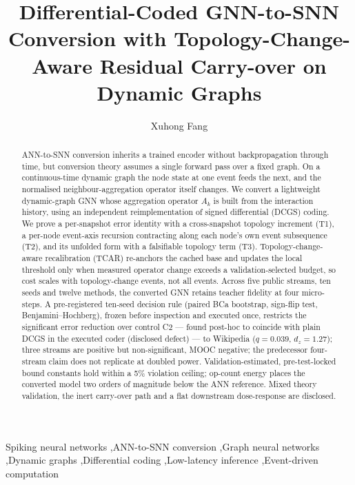 \documentclass[preprint,12pt]{elsarticle}
\begin{document}
\begin{frontmatter}

\title{Differential-Coded GNN-to-SNN Conversion with Topology-Change-Aware Residual Carry-over on Dynamic Graphs}

\author{Xuhong Fang}
\address{Dongguan City College, Dongguan, Guangdong, China}

\begin{abstract}
ANN-to-SNN conversion inherits a trained encoder without backpropagation through time, but conversion theory assumes a single forward pass over a fixed graph. On a continuous-time dynamic graph the node state at one event feeds the next, and the normalised neighbour-aggregation operator itself changes. We convert a lightweight dynamic-graph GNN whose aggregation operator $A_k$ is built from the interaction history, using an independent reimplementation of signed differential (DCGS) coding. We prove a per-snapshot error identity with a cross-snapshot topology increment (T1), a per-node event-axis recursion contracting along each node's own event subsequence (T2), and its unfolded form with a falsifiable topology term (T3). Topology-change-aware recalibration (TCAR) re-anchors the cached base and updates the local threshold only when measured operator change exceeds a validation-selected budget, so cost scales with topology-change events, not all events. Across five public streams, ten seeds and twelve methods, the converted GNN retains teacher fidelity at four micro-steps. A pre-registered ten-seed decision rule (paired BCa bootstrap, sign-flip test, Benjamini--Hochberg), frozen before inspection and executed once, restricts the significant error reduction over control C2 --- found post-hoc to coincide with plain DCGS in the executed coder (disclosed defect) --- to Wikipedia ($q=0.039$, $d_z=1.27$); three streams are positive but non-significant, MOOC negative; the predecessor four-stream claim does not replicate at doubled power. Validation-estimated, pre-test-locked bound constants hold within a 5\% violation ceiling; op-count energy places the converted model two orders of magnitude below the ANN reference. Mixed theory validation, the inert carry-over path and a flat downstream dose-response are disclosed.
\end{abstract}

\begin{keyword}
Spiking neural networks \sep ANN-to-SNN conversion \sep Graph neural networks \sep Dynamic graphs \sep Differential coding \sep Low-latency inference \sep Event-driven computation
\end{keyword}

\end{frontmatter}
\end{document}
